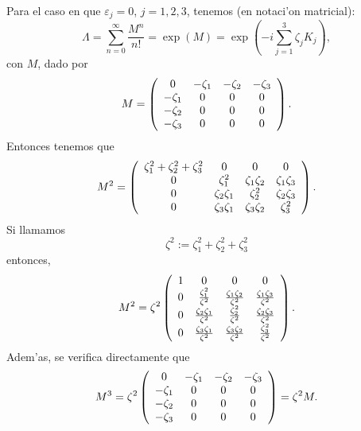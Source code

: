 Para el caso en que $\varepsilon_j=0$, $j=1,2,3$, tenemos (en notaci'on
matricial):
\begin{equation}
\Lambda=\sum_{n=0}^{\infty}\frac{M^{n}}{n!}=\exp(M)=\exp\left(
-i\sum_{j=1}^3\zeta_j K_j\right),
\end{equation}
con $M$, dado por
\begin{equation}
M=\left(
\begin{array}
[c]{cccc}
0 & -\zeta_1 & -\zeta_2 & -\zeta_3\\
-\zeta_1 & 0 & 0 & 0\\
-\zeta_2 & 0 & 0 & 0\\
-\zeta_3 & 0 & 0 & 0
\end{array}
\right).
\end{equation}
Entonces tenemos que
\begin{equation}
M^2=\left(
\begin{array}
[c]{cccc}
\zeta_1^2+\zeta_2^2+\zeta_3^2 & 0 & 0 & 0\\
0 & \zeta_1^2 & \zeta_1\zeta_2 & \zeta_1\zeta_3\\
0 & \zeta_2\zeta_1 & \zeta_2^2 & \zeta_2\zeta_3\\
0 & \zeta_3\zeta_1 & \zeta_3\zeta_2 & \zeta_3^2
\end{array}
\right).
\end{equation}
Si llamamos
\begin{equation}
\zeta^2:=\zeta_1^2+\zeta_2^2+\zeta_3^2
\end{equation}
entonces,
\begin{equation}
M^2=\zeta^2\left(
\begin{array}
[c]{cccc}
1 & 0 & 0 & 0\\
0 & \frac{\zeta_1^2}{\zeta^2} & \frac{\zeta_1\zeta_2}{\zeta^2} &
\frac{\zeta_1\zeta_3}{\zeta^2}\\
0 & \frac{\zeta_2\zeta_1}{\zeta^2} & \frac{\zeta_2^2}{\zeta^2} &
\frac{\zeta_2\zeta_3}{\zeta^2}\\
0 & \frac{\zeta_3\zeta_1}{\zeta^2} & \frac{\zeta_3\zeta_2}{\zeta
^2} & \frac{\zeta_3^2}{\zeta^2}
\end{array}
\right).
\end{equation}
Adem'as, se verifica directamente que
\begin{equation}
M^3=\zeta^2\left(
\begin{array}
[c]{cccc}
0 & -\zeta_1 & -\zeta_2 & -\zeta_3\\
-\zeta_1 & 0 & 0 & 0\\
-\zeta_2 & 0 & 0 & 0\\
-\zeta_3 & 0 & 0 & 0
\end{array}
\right)=\zeta^2 M .
\end{equation}
